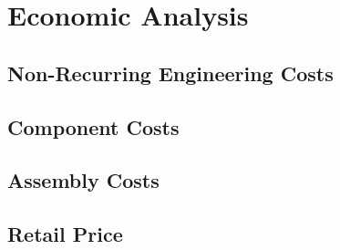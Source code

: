 \section{Economic Analysis}

\subsection{Non-Recurring Engineering Costs}
\subsection{Component Costs}
\subsection{Assembly Costs}
\subsection{Retail Price}
